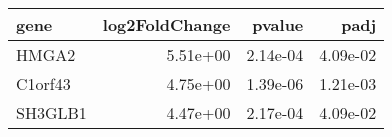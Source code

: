 \begin{tabular}{lrrr}
\toprule
   gene &  log2FoldChange &   pvalue &     padj \\
\midrule
  HMGA2 &        5.51e+00 & 2.14e-04 & 4.09e-02 \\
C1orf43 &        4.75e+00 & 1.39e-06 & 1.21e-03 \\
SH3GLB1 &        4.47e+00 & 2.17e-04 & 4.09e-02 \\
\bottomrule
\end{tabular}
